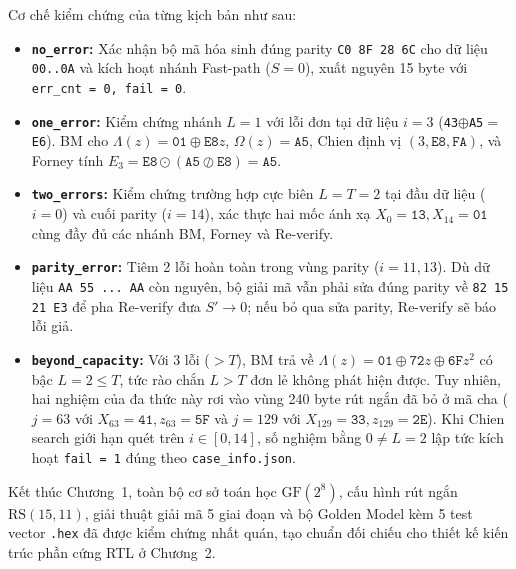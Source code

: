 Cơ chế kiểm chứng của từng kịch bản như sau:
\begin{itemize}
    \item \textbf{\texttt{no\_error}:} Xác nhận bộ mã hóa sinh đúng parity \texttt{C0 8F 28 6C} cho dữ liệu \texttt{00..0A} và kích hoạt nhánh Fast-path ($S = 0$), xuất nguyên 15 byte với \texttt{err\_cnt = 0, fail = 0}.
    \item \textbf{\texttt{one\_error}:} Kiểm chứng nhánh $L=1$ với lỗi đơn tại dữ liệu $i=3$ (\texttt{43}$\oplus$\texttt{A5}$=$\texttt{E6}). BM cho $\Lambda(z)=\texttt{01}\oplus\texttt{E8}z$, $\Omega(z)=\texttt{A5}$, Chien định vị $(3, \texttt{E8}, \texttt{FA})$, và Forney tính $E_3 = \texttt{E8}\odot(\texttt{A5}\oslash\texttt{E8}) = \texttt{A5}$.
    \item \textbf{\texttt{two\_errors}:} Kiểm chứng trường hợp cực biên $L=T=2$ tại đầu dữ liệu ($i=0$) và cuối parity ($i=14$), xác thực hai mốc ánh xạ $X_0=\texttt{13}, X_{14}=\texttt{01}$ cùng đầy đủ các nhánh BM, Forney và Re-verify.
    \item \textbf{\texttt{parity\_error}:} Tiêm 2 lỗi hoàn toàn trong vùng parity ($i=11, 13$). Dù dữ liệu \texttt{AA 55 ... AA} còn nguyên, bộ giải mã vẫn phải sửa đúng parity về \texttt{82 15 21 E3} để pha Re-verify đưa $S' \to 0$; nếu bỏ qua sửa parity, Re-verify sẽ báo lỗi giả.
    \item \textbf{\texttt{beyond\_capacity}:} Với 3 lỗi ($>T$), BM trả về $\Lambda(z) = \texttt{01} \oplus \texttt{72}z \oplus \texttt{6F}z^2$ có bậc $L = 2 \le T$, tức rào chắn $L > T$ đơn lẻ không phát hiện được. Tuy nhiên, hai nghiệm của đa thức này rơi vào vùng 240 byte rút ngắn đã bỏ ở mã cha ($j = 63$ với $X_{63}=\texttt{41}, z_{63}=\texttt{5F}$ và $j = 129$ với $X_{129}=\texttt{33}, z_{129}=\texttt{2E}$). Khi Chien search giới hạn quét trên $i \in [0, 14]$, số nghiệm bằng $0 \neq L = 2$ lập tức kích hoạt \texttt{fail = 1} đúng theo \texttt{case\_info.json}.
\end{itemize}

Kết thúc Chương~1, toàn bộ cơ sở toán học $\text{GF}(2^8)$, cấu hình rút ngắn $\text{RS}(15,11)$, giải thuật giải mã 5 giai đoạn và bộ Golden Model kèm 5 test vector \texttt{.hex} đã được kiểm chứng nhất quán, tạo chuẩn đối chiếu cho thiết kế kiến trúc phần cứng RTL ở Chương~2.
